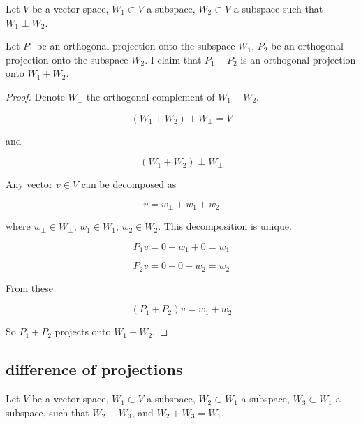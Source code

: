 \documentclass{article}
\begin{document}
\begin{appendices}
Let $V$ be a vector space, $W_1 \subset V$ a subspace, $W_2 \subset V$ a subspace such that $W_1 \perp W_2$.

Let $P_1$ be an orthogonal projection onto the subspace $W_1$, $P_2$ be an orthogonal projection onto the subspace $W_2$. I claim that $P_1 + P_2$ is an orthogonal projection onto $W_1 + W_2$.

\begin{proof}

Denote $W_{\perp}$ the orthogonal complement of $W_1+W_2$.

\begin{equation}
    (W_1 + W_2) + W_{\perp} = V
\end{equation}

and

\begin{equation}
    (W_1 + W_2) \perp W_{\perp}
\end{equation}

Any vector $v \in V$ can be decomposed as

\begin{equation}
    v = w_{\perp} + w_1 + w_2
\end{equation}

where $w_{\perp} \in W_{\perp}$, $w_1 \in W_1$, $w_2 \in W_2$. This decomposition is unique.

\begin{equation}
    P_1 v = 0 + w_1 + 0 = w_1
\end{equation}

\begin{equation}
    P_2 v = 0 + 0 + w_2 = w_2
\end{equation}

From these

\begin{equation}
    (P_1 + P_2) v = w_1 + w_2
\end{equation}

So $P_1 + P_2$ projects onto $W_1 + W_2$.

\end{proof}


\subsection{difference of projections} \label{app:diff_proj}

Let $V$ be a vector space, $W_1 \subset V$ a subspace, $W_2 \subset W_1$ a subspace, $W_3 \subset W_1$ a subspace, such that $W_2 \perp W_3$, and $W_2 + W_3 = W_1$.


\end{appendices}
\end{document}
